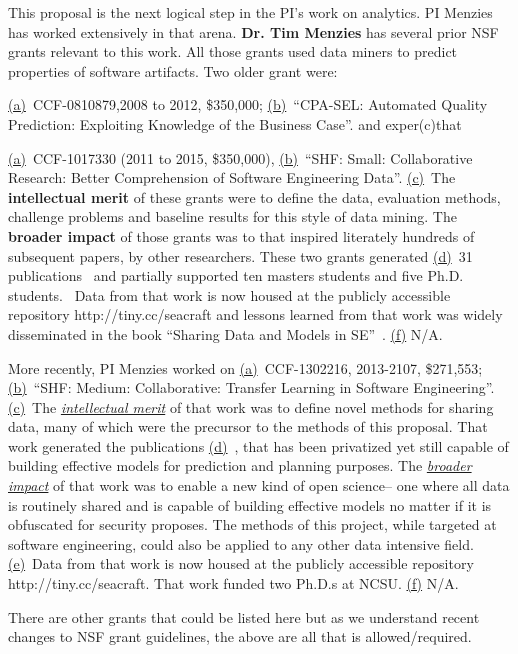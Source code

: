 This proposal is the next logical step in the PI's work on analytics.
{PI Menzies} has worked extensively in that arena.
\textbf{Dr. Tim Menzies} has several prior NSF  grants relevant to this work. All those grants
used data miners to predict properties of software artifacts. 
Two  older grant were:
\bi
\item
\underline{(a)}~CCF-0810879,2008 to 2012, \$350,000;
\underline{(b)}~``CPA-SEL: Automated Quality Prediction: Exploiting Knowledge of the Business Case''.
 and exper(c)that 
\item \underline{(a)}~CCF-1017330 (2011 to 2015,  \$350,000),
\underline{(b)}~``SHF: Small: Collaborative Research: Better Comprehension of Software Engineering Data''. 
\ei
\underline{(c)}~The {\bf intellectual merit} of these grants were to define the data, evaluation methods, challenge problems and baseline results for this style of data mining.  The {\bf broader impact} of those grants was to  that inspired literately hundreds of subsequent papers,
 by other researchers.
These two grants generated \underline{(d)}~31 publications~\cite{%
jiang08a,%
me09n,%
me09i,%
me09b,%
me10d,%
Bavota2010,%
Bavota2012a,%
Bavota2013,%
Bavota2012b,%
Haiduc2010a,%
Haiduc2013a,%
Haiduc2012a,%
Haiduc2013b,%
Marcus2010b,%
Ohlemacher2011b,%
Scanniello2013,%
Scanniello2011,%
me11m,%
peters12,%
Me13,%
me13a,peters12a} and 
partially supported ten masters students and five Ph.D. students. ~Data from that work is now housed at the publicly accessible repository http://tiny.cc/seacraft and lessons learned from that work was widely disseminated in the book ``Sharing Data and Models in SE''~\cite{Menzies:2014:SDM:2930830}. \underline{(f)} N/A.  



More recently, PI Menzies worked on \underline{(a)}~CCF-1302216, 2013-2107, \$271,553;   \underline{(b)}~``SHF: Medium: Collaborative: Transfer Learning in Software Engineering''. 
 \underline{(c)}~The \underline{{\em intellectual merit}} of that work was to
define novel methods for sharing data, many of which were the precursor to the methods of this proposal.  That work generated the publications  \underline{(d)}~\cite{krishna2018bellwethers,PetersML15,krishna16,he13,Me17,fu2016tuning,krishna2017learning,nam2017heterogeneous}, that has been privatized
yet still  capable of building effective
models
for prediction and planning purposes.
The \underline{{\em broader impact}} of that work was to
enable a new kind of open science-- one where all data is routinely shared and is capable of building effective models no matter if it is obfuscated for security proposes.
The methods of this project, while targeted at software engineering, could also be applied to any other data intensive field.   
 \underline{(e)}~Data from that work is now housed at the publicly accessible repository http://tiny.cc/seacraft. That work  funded two Ph.D.s at NCSU. \underline{(f)}
N/A.  

There are other grants that could be listed here but as we understand recent changes to NSF grant guidelines, the above are all that is allowed/required.